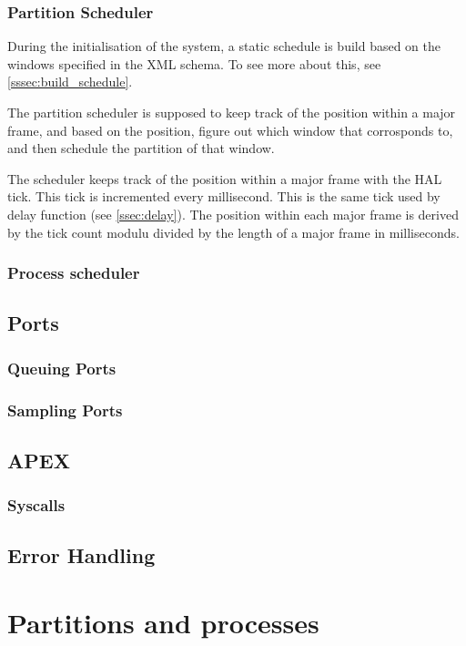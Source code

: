 \subsubsection{Partition Scheduler}
During the initialisation of the system, a static schedule is build based on the
windows specified in the XML schema. To see more about this, see \ref{sssec:build_schedule}.

The partition scheduler is supposed to keep track of the position within a major
frame, and based on the position, figure out which window that corrosponds to,
and then schedule the partition of that window.

The scheduler keeps track of the position within a major frame with the HAL
tick. This tick is incremented every millisecond. This is the same tick used by
delay function (see \ref{ssec:delay}). The position within each major frame is
derived by the tick count modulu divided by the length of a major frame in
milliseconds.


\subsubsection{Process scheduler}


\subsection{Ports}

\subsubsection{Queuing Ports}
\subsubsection{Sampling Ports}


\subsection{APEX}

\subsubsection{Syscalls}


\subsection{Error Handling}


\section{Partitions and processes}

